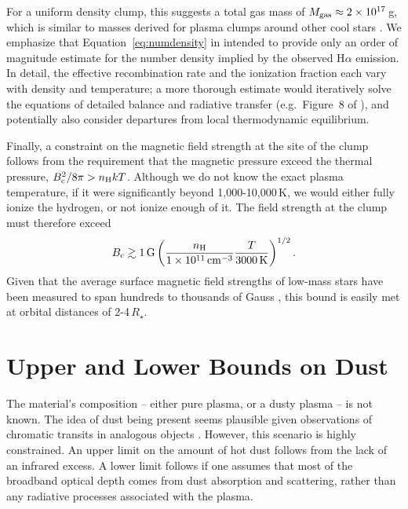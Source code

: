 \documentclass[11pt,twocolumn,tighten]{aastex7}
\begin{document}
For a uniform density clump, this suggests a total gas mass of $M_{\rm
gas}\approx 2\times10^{17}$\,g, which is similar to masses derived for
plasma clumps around other cool stars \citep{VillarrealDAngelo2019}.  We emphasize that
Equation~\ref{eq:numdensity} in intended to provide only an order of
magnitude estimate for the number density implied by the observed
H$\alpha$ emission.  In detail, the effective recombination rate and
the ionization fraction each vary with density and temperature; a more
thorough estimate would iteratively solve the equations of detailed
balance and radiative transfer (e.g.~Figure~8 of \citealt{CollierCameron1989}),
and potentially also consider departures from local thermodynamic equilibrium.

Finally, a constraint on the magnetic field strength at the site of
the clump follows from the requirement that the magnetic pressure
exceed the thermal pressure, $B_{\rm c}^2 / 8\pi > n_{\rm H} k T$.
Although we do not know the exact plasma temperature, if it were
significantly beyond 1,000-10,000\,K, we would either fully ionize the
hydrogen, or not ionize enough of it.  The field strength at the clump
must therefore exceed
\begin{equation}
  B_{\rm c} \gtrsim 1\,{\rm G}
  \left(
  \frac{n_{\rm H}}{1\times10^{11}\,{\rm cm}^{-3}}
  \frac{T}{3000\,{\rm K}}
  \right)^{1/2}.
\end{equation}
Given that the average surface magnetic field strengths of low-mass
stars have been measured to span hundreds to thousands of Gauss
\citep{Donati2009,Kochukhov2021,Reiners2022}, this bound is easily met
at orbital distances of 2-4\,$R_\star$.

\section{Upper and Lower Bounds on Dust}
\label{subsec:dust}

The material's composition -- either pure plasma, or a dusty plasma --
is not known.  The idea of dust being present seems plausible given
observations of chromatic transits in analogous objects
\citep{Tanimoto2020,Gunther2022,Koen2023}.  However, this scenario is
highly constrained.  An upper limit on the amount of hot dust follows
from the lack of an infrared excess.  A lower limit follows if one
assumes that most of the broadband optical depth comes from dust
absorption and scattering, rather than any radiative processes
associated with the plasma.
\end{document}

